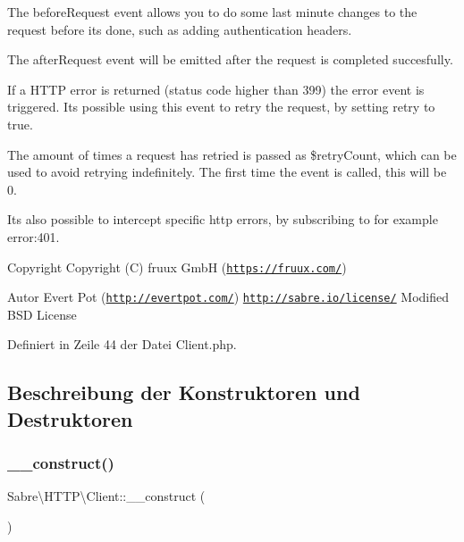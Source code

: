 The before\+Request event allows you to do some last minute changes to the request before it\textquotesingle{}s done, such as adding authentication headers.

The after\+Request event will be emitted after the request is completed succesfully.

If a H\+T\+TP error is returned (status code higher than 399) the error event is triggered. It\textquotesingle{}s possible using this event to retry the request, by setting retry to true.

The amount of times a request has retried is passed as \$retry\+Count, which can be used to avoid retrying indefinitely. The first time the event is called, this will be 0.

It\textquotesingle{}s also possible to intercept specific http errors, by subscribing to for example \textquotesingle{}error\+:401\textquotesingle{}.

\begin{DoxyCopyright}{Copyright}
Copyright (C) fruux GmbH (\href{https://fruux.com/}{\tt https\+://fruux.\+com/}) 
\end{DoxyCopyright}
\begin{DoxyAuthor}{Autor}
Evert Pot (\href{http://evertpot.com/}{\tt http\+://evertpot.\+com/})  \href{http://sabre.io/license/}{\tt http\+://sabre.\+io/license/} Modified B\+SD License 
\end{DoxyAuthor}


Definiert in Zeile 44 der Datei Client.\+php.



\subsection{Beschreibung der Konstruktoren und Destruktoren}
\mbox{\label{class_sabre_1_1_h_t_t_p_1_1_client_a2d20620eaf735a3286d162bca9d4960b}} 
\subsubsection{\texorpdfstring{\+\_\+\+\_\+construct()}{\_\_construct()}}
{\footnotesize\ttfamily Sabre\textbackslash{}\+H\+T\+T\+P\textbackslash{}\+Client\+::\+\_\+\+\_\+construct (\begin{DoxyParamCaption}{ }\end{DoxyParamCaption})}

